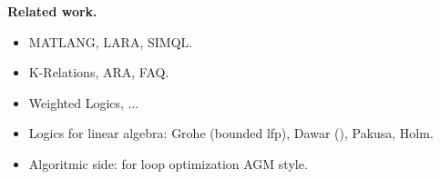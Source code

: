 %
%


\medskip
\noindent
\textbf{Related work.} 

\begin{itemize}
\item MATLANG, LARA, SIMQL.

\item K-Relations, ARA, FAQ.

\item Weighted Logics, ...

\item Logics for linear algebra: Grohe (bounded lfp), Dawar (), Pakusa, Holm.

\item Algoritmic side: for loop optimization AGM style.
\end{itemize}


